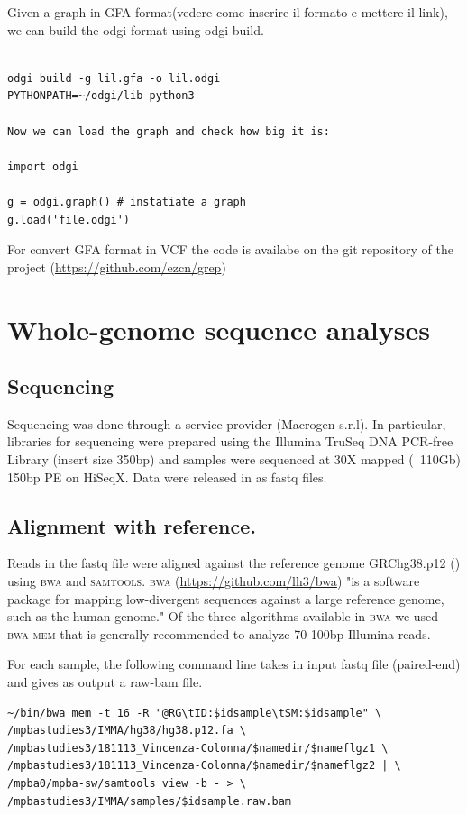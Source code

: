 \documentclass[
tikz,
11pt, %
oneside, %
english, %
singlespacing, %
headsepline, %
]{MastersDoctoralThesisV2} %
\begin{document}
Given a graph in GFA format(vedere come inserire il formato e mettere il link), we can build the odgi format using odgi build.

\begin{verbatim}

odgi build -g lil.gfa -o lil.odgi
PYTHONPATH=~/odgi/lib python3

Now we can load the graph and check how big it is:

import odgi

g = odgi.graph() # instatiate a graph
g.load('file.odgi')

\end{verbatim}


For convert GFA format in VCF the code is availabe on the git repository of the project (\url{https://github.com/ezcn/grep}) 

\section {Whole-genome sequence analyses}

\subsection{Sequencing}
Sequencing was done through a service provider (Macrogen s.r.l). In particular, libraries for sequencing were prepared using the Illumina TruSeq DNA PCR-free Library (insert size 350bp) and samples were sequenced at 30X mapped (~110Gb) 150bp PE on HiSeqX. Data were released in as fastq files. 

\subsection{Alignment with reference.} Reads in the fastq file were aligned against the reference genome GRChg38.p12 (\cite{rosenbloom2015ucsc}) using \textsc{bwa} and \textsc{samtools}. \textsc{bwa} (\url{https://github.com/lh3/bwa}) "is a software package for mapping low-divergent sequences against a large reference genome, such as the human genome." Of the three algorithms available in \textsc{bwa} we used \textsc{bwa-mem}  that is generally recommended to analyze 70-100bp Illumina reads. 

For each sample, the following command line takes in input fastq file (paired-end) and gives as output a raw-bam file. 

\begin{verbatim}
~/bin/bwa mem -t 16 -R "@RG\tID:$idsample\tSM:$idsample" \
/mpbastudies3/IMMA/hg38/hg38.p12.fa \ 
/mpbastudies3/181113_Vincenza-Colonna/$namedir/$nameflgz1 \ 
/mpbastudies3/181113_Vincenza-Colonna/$namedir/$nameflgz2 | \ 
/mpba0/mpba-sw/samtools view -b - > \
/mpbastudies3/IMMA/samples/$idsample.raw.bam
\end{verbatim}
\end{document}
